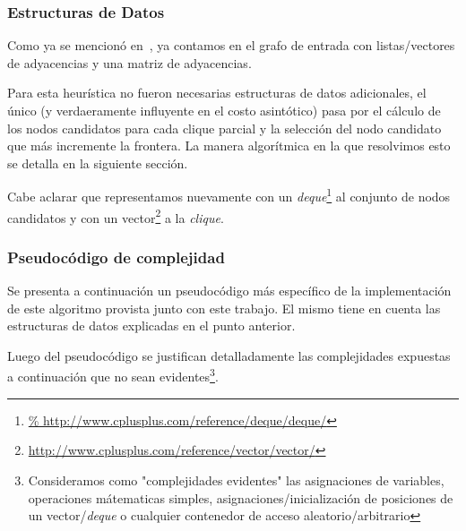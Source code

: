 \subsubsection{Estructuras de Datos}
\par Como ya se mencion\'o en~, ya contamos en el grafo
    de entrada con listas/vectores de adyacencias y una matriz de adyacencias.

\par Para esta heur\'istica no fueron necesarias estructuras de datos adicionales,
   el \'unico (y verdaeramente influyente en el costo asint\'otico) pasa por el
   c\'alculo de los nodos candidatos para cada clique parcial y la selecci\'on
   del nodo candidato que m\'as incremente la frontera. La manera algor\'itmica
   en la que resolvimos esto se detalla en la siguiente secci\'on.

\par Cabe aclarar que representamos nuevamente con un \emph{deque}\footnote{\url{%
    http://www.cplusplus.com/reference/deque/deque/}} al conjunto de nodos candidatos
    y con un vector\footnote{\url{http://www.cplusplus.com/reference/vector/vector/}}
    a la \emph{clique}.

\subsubsection{Pseudoc\'odigo de complejidad}
\par Se presenta a continuaci\'on un pseudoc\'odigo m\'as espec\'ifico de la implementaci\'on
    de este algoritmo provista junto con este trabajo. El mismo tiene en cuenta
    las estructuras de datos explicadas en el punto anterior.

\par Luego del pseudoc\'odigo se justifican detalladamente las complejidades
    expuestas a continuaci\'on que no sean evidentes\footnote{Consideramos
    como "complejidades evidentes" las asignaciones de variables, operaciones
    m\'atematicas simples, asignaciones/inicializaci\'on de posiciones de
    un vector/\emph{deque} o cualquier contenedor de acceso aleatorio/arbitrario}.

\bigskip

